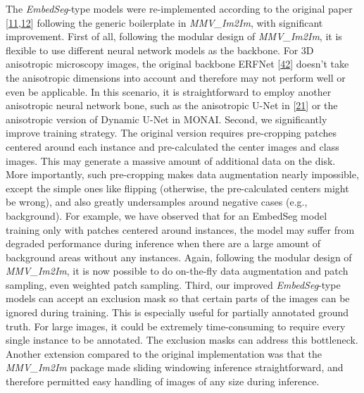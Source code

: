 The \emph{EmbedSeg}-type models were re-implemented according to the original paper {[}\protect\hyperlink{ref-K2ugNcVa}{11},\protect\hyperlink{ref-QmYuUQ5K}{12}{]} following the generic boilerplate in \emph{MMV\_Im2Im}, with significant improvement. First of all, following the modular design of \emph{MMV\_Im2Im}, it is flexible to use different neural network models as the backbone. For 3D anisotropic microscopy images, the original backbone ERFNet {[}\protect\hyperlink{ref-XAkgs3Nh}{42}{]} doesn't take the anisotropic dimensions into account and therefore may not perform well or even be applicable. In this scenario, it is straightforward to employ another anisotropic neural network bone, such as the anisotropic U-Net in {[}\protect\hyperlink{ref-jM3v1UjQ}{21}{]} or the anisotropic version of Dynamic U-Net in MONAI. Second, we significantly improve training strategy. The original version requires pre-cropping patches centered around each instance and pre-calculated the center images and class images. This may generate a massive amount of additional data on the disk. More importantly, such pre-cropping makes data augmentation nearly impossible, except the simple ones like flipping (otherwise, the pre-calculated centers might be wrong), and also greatly undersamples around negative cases (e.g., background). For example, we have observed that for an EmbedSeg model training only with patches centered around instances, the model may suffer from degraded performance during inference when there are a large amount of background areas without any instances. Again, following the modular design of \emph{MMV\_Im2Im}, it is now possible to do on-the-fly data augmentation and patch sampling, even weighted patch sampling. Third, our improved \emph{EmbedSeg}-type models can accept an exclusion mask so that certain parts of the images can be ignored during training. This is especially useful for partially annotated ground truth. For large images, it could be extremely time-consuming to require every single instance to be annotated. The exclusion masks can address this bottleneck. Another extension compared to the original implementation was that the \emph{MMV\_Im2Im} package made sliding windowing inference straightforward, and therefore permitted easy handling of images of any size during inference.

